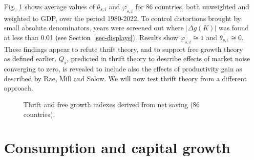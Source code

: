 Fig.~\ref{fig-si_plots} shows average values of \(\theta_{s,i}\) and
\(\varphi_{s,i}\) for 86 countries, both unweighted and weighted to GDP,
over the period 1980-2022. To control distortions brought by small
absolute denominators, years were screened out where \(|\Delta g(K)|\)
was found at less than 0.01 (see Section~\ref{sec-displays}). Results
show \(\overline{\varphi_{s,i}} \cong 1\) and \(\overline{\theta_{s,i}} \cong 0\). These findings
appear to refute thrift theory, and to support free growth theory as
defined earlier. \(Q_s\), predicted in thrift theory to describe effects
of market noise converging to zero, is revealed to include also the
effects of productivity gain as described by Rae, Mill and Solow. We
will now test thrift theory from a different approach.
%
\FloatBarrier
\begin{figure}[pos=H]
    \centering
    \quad %
    \captionsetup{justification=centering}
    \caption{Thrift and free growth indexes derived from net saving (86 countries).}
    \label{fig-si_plots}
\end{figure}
%

\FloatBarrier
%
\hypertarget{consumption-and-capital-growth}{%
\section{Consumption and capital growth}\label{consumption-and-capital-growth}}

